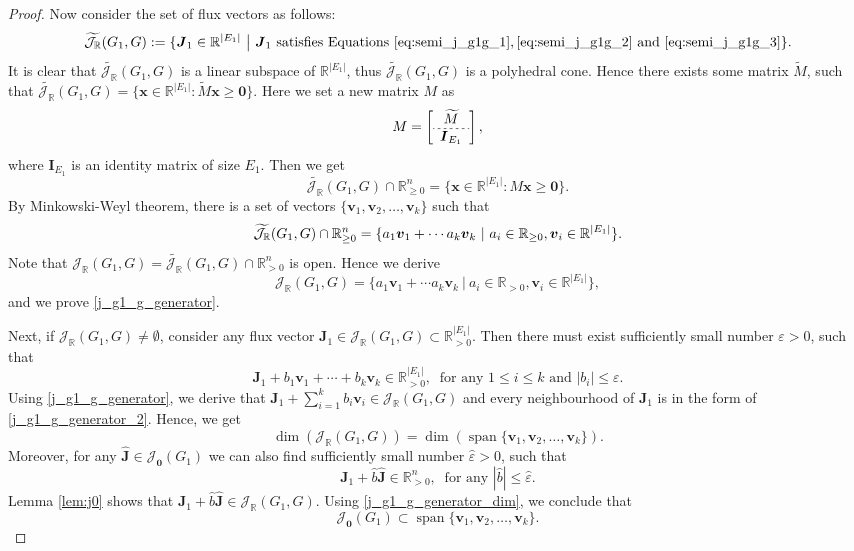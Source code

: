 \documentclass[11pt]{article}
\theoremstyle{plain}
\theoremstyle{definition}
\theoremstyle{remark}
\newcommand\RR{\mathbb{R}}
\newcommand\bx{\boldsymbol{x}}
\newcommand\bv{\boldsymbol{v}}
\newcommand\bI{\boldsymbol{I}}
\newcommand\bJ{\boldsymbol{J}}
\newcommand\hbJ{\hat{\boldsymbol{J}}}
\newcommand{\mJ}{\mathcal{J}_{\RR}}
\newcommand{\eJ}{\mathcal{J}_{\textbf{0}}}
\DeclareMathOperator{\spn}{span}
\begin{document}
\begin{proof}
Now consider the set of flux vectors as follows:
\begin{equation} \notag
\widetilde{\mJ} (G_1, G) := \{ \bJ_1 \in \RR^{|E_1|} \ \big| \ \bJ_1 
\text{ satisfies Equations}~\eqref{eq:semi_j_g1g_1}, \eqref{eq:semi_j_g1g_2}
\text{ and }
\eqref{eq:semi_j_g1g_3} 
\}.
\end{equation}
It is clear that $\widetilde{\mJ} (G_1, G)$ is a linear subspace of $\RR^{|E_1|}$, thus $\widetilde{\mJ} (G_1, G)$ is a polyhedral cone.
Hence there exists some matrix $\widetilde{M}$, such that
$\widetilde{\mJ} (G_1, G) = \{\bx \in \RR^{|E_1|}: \widetilde{M} \bx \geq \textbf{0} \}$. 
Here we set a new matrix $M$ as 
\[
M =
\left[\begin{array}{c}
\widetilde{M} \\ \hdashline[2pt/2pt] 
\bI_{E_1}
\end{array}
\right],
\]
where $\bI_{E_1}$ is an identity matrix of size $E_1$.
Then we get
\[
\widetilde{\mJ} (G_1, G) \cap \RR^n_{\geq 0} = \{\bx \in \RR^{|E_1|}: M \bx \geq \textbf{0} \}.
\]
By Minkowski-Weyl theorem, there is a set of vectors $\{ \bv_1, \bv_2, \ldots, \bv_k \}$ such that 
\begin{equation} \notag
\widetilde{\mJ} (G_1, G) \cap \RR^n_{\geq 0} = \{ a_1 \bv_1 + \cdots a_k \bv_k \ | \ a_i \in \RR_{\geq 0}, \bv_i \in \RR^{|E_1|} \}.
\end{equation} 
Note that $\mJ (G_1, G) = \widetilde{\mJ} (G_1, G) \cap \RR^n_{>0}$ is open.
Hence we derive
\[
\mJ (G_1, G) = \{ a_1 \bv_1 + \cdots a_k \bv_k \ | \ a_i \in \RR_{>0}, \bv_i \in \RR^{|E_1|}\},
\]
and we prove \eqref{j_g1_g_generator}.

\medskip

Next, if $\mJ (G_1, G) \neq \emptyset$, consider any flux vector $\bJ_1 \in \mJ (G_1, G) \subset \RR^{|E_1|}_{>0}$. Then there must exist sufficiently small number $\varepsilon > 0$, such that
\begin{equation} \label{j_g1_g_generator_2}
\bJ_1 + b_1 \bv_1 + \cdots + b_k \bv_k \in \RR^{|E_1|}_{>0},
\ \text{ for any }
1 \leq i \leq k \text{ and }
|b_i| \leq \varepsilon.
\end{equation}
Using \eqref{j_g1_g_generator}, we derive that $\bJ_1 + \sum\limits^k_{i=1} b_i \bv_i \in \mJ (G_1, G)$ and every neighbourhood of $\bJ_1$ is in the form of \eqref{j_g1_g_generator_2}. Hence, we get
\begin{equation} \label{j_g1_g_generator_dim}
\dim (\mJ (G_1, G)) =\dim ( \spn \{ \bv_1, \bv_2, \ldots, \bv_k \} ).
\end{equation}
Moreover, for any $\hbJ \in \eJ(G_1)$ we can also find sufficiently small number $\hat{\varepsilon} > 0$, such that
\[
\bJ_1 + \hat{b} \hbJ \in \RR^n_{>0},
\ \text{ for any }
|\hat{b}| \leq \hat{\varepsilon}.
\]
Lemma \ref{lem:j0} shows that $\bJ_1 + \hat{b} \hbJ \in \mJ (G_1, G)$.
Using \eqref{j_g1_g_generator_dim}, we conclude that
\[
\eJ(G_1) \subset \spn \{ \bv_1, \bv_2, \ldots, \bv_k \}.
\]
\end{proof}
\end{document}
